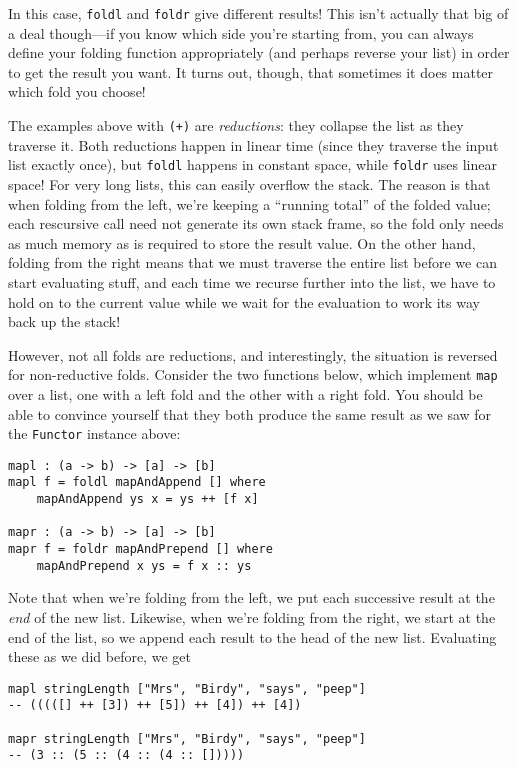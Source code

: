 \documentclass{book}
\newcommand{\mlil}[1]{\lstinline[language=pseudoml,columns=fixed]|#1|}\usepackage{caption}
\begin{document}
In this case, \mlil{foldl} and \mlil{foldr} give different results! This isn't actually that big of a deal though---if you know which side you're starting from, you can always define your folding function appropriately (and perhaps reverse your list) in order to get the result you want. It turns out, though, that sometimes it does matter which fold you choose!

The examples above with \texttt{(+)} are \emph{reductions}: they collapse the list as they traverse it. Both reductions happen in linear time (since they traverse the input list exactly once), but \mlil{foldl} happens in constant space, while \mlil{foldr} uses linear space! For very long lists, this can easily overflow the stack. The reason is that when folding from the left, we're keeping a ``running total'' of the folded value; each rescursive call need not generate its own stack frame, so the fold only needs as much memory as is required to store the result value. On the other hand, folding from the right means that we must traverse the entire list before we can start evaluating stuff, and each time we recurse further into the list, we have to hold on to the current value while we wait for the evaluation to work its way back up the stack!

However, not all folds are reductions, and interestingly, the situation is reversed for non-reductive folds. Consider the two functions below, which implement \mlil{map} over a list, one with a left fold and the other with a right fold. You should be able to convince yourself that they both produce the same result as we saw for the \mlil{Functor} instance above:

\begin{lstlisting}[language=pseudoml]
mapl : (a -> b) -> [a] -> [b]
mapl f = foldl mapAndAppend [] where
    mapAndAppend ys x = ys ++ [f x]

mapr : (a -> b) -> [a] -> [b]
mapr f = foldr mapAndPrepend [] where
    mapAndPrepend x ys = f x :: ys
\end{lstlisting}

Note that when we're folding from the left, we put each successive result at the \emph{end} of the new list. Likewise, when we're folding from the right, we start at the end of the list, so we append each result to the head of the new list. Evaluating these as we did before, we get

\begin{lstlisting}[language=pseudoml]
mapl stringLength ["Mrs", "Birdy", "says", "peep"]
-- (((([] ++ [3]) ++ [5]) ++ [4]) ++ [4])

mapr stringLength ["Mrs", "Birdy", "says", "peep"]
-- (3 :: (5 :: (4 :: (4 :: []))))
\end{lstlisting}
\end{document}
